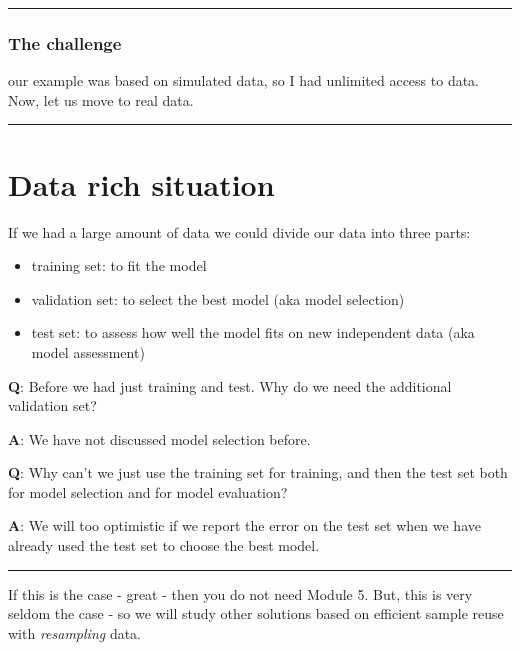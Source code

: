 \documentclass[]{article}
\providecommand{\tightlist}{%
  \setlength{\itemsep}{0pt}\setlength{\parskip}{0pt}}
\begin{document}
\begin{center}\rule{0.5\linewidth}{\linethickness}\end{center}

\hypertarget{the-challenge}{%
\subsubsection{The challenge}\label{the-challenge}}

our example was based on simulated data, so I had unlimited access to
data. Now, let us move to real data.

\begin{center}\rule{0.5\linewidth}{\linethickness}\end{center}

\hypertarget{data-rich-situation}{%
\section{Data rich situation}\label{data-rich-situation}}

If we had a large amount of data we could divide our data into three
parts:

\begin{itemize}
\tightlist
\item
  training set: to fit the model
\item
  validation set: to select the best model (aka model selection)
\item
  test set: to assess how well the model fits on new independent data
  (aka model assessment)
\end{itemize}

\textbf{Q}: Before we had just training and test. Why do we need the
additional validation set?

\textbf{A}: We have not discussed model selection before.

\textbf{Q}: Why can't we just use the training set for training, and
then the test set both for model selection and for model evaluation?

\textbf{A}: We will too optimistic if we report the error on the test
set when we have already used the test set to choose the best model.

\begin{center}\rule{0.5\linewidth}{\linethickness}\end{center}

If this is the case - great - then you do not need Module 5. But, this
is very seldom the case - so we will study other solutions based on
efficient sample reuse with \emph{resampling} data.
\end{document}
